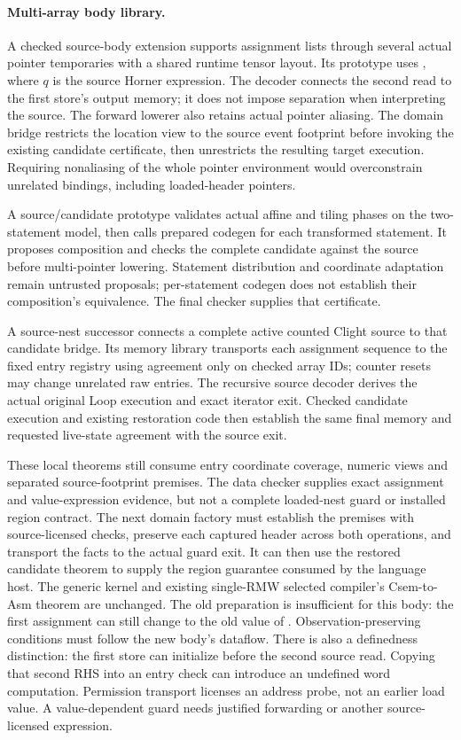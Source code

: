 \paragraph{Multi-array body library.}
A checked source-body extension supports assignment lists through several
actual pointer temporaries with a shared runtime tensor layout. Its prototype
uses , where $q$ is the source
Horner expression. The decoder connects the second read to the first store's
output memory; it does not impose separation when interpreting the source.
The forward lowerer also retains actual pointer aliasing. The domain bridge
restricts the location view to the source event footprint before invoking the
existing candidate certificate, then unrestricts the resulting target execution.
Requiring nonaliasing of the whole pointer environment would overconstrain
unrelated bindings, including loaded-header pointers.

A source/candidate prototype validates actual affine and tiling phases on
the two-statement model, then calls prepared codegen for each transformed
statement. It proposes composition and checks the complete candidate against
the source before multi-pointer lowering. Statement distribution and coordinate
adaptation remain untrusted proposals; per-statement codegen does not establish
their composition's equivalence. The final checker supplies that certificate.

A source-nest successor connects a complete active counted Clight source to
that candidate bridge. Its memory library transports each assignment sequence
to the fixed entry registry using agreement only on checked array IDs;
counter resets may change unrelated raw entries. The recursive source decoder
derives the actual original Loop execution and exact iterator exit. Checked
candidate execution and existing restoration code then establish the same
final memory and requested live-state agreement with the source exit.

These local theorems still consume entry coordinate coverage, numeric views
and separated source-footprint premises. The data checker supplies exact
assignment and value-expression evidence, but not a complete loaded-nest
guard or installed region contract. The next domain factory must establish
the premises with source-licensed checks, preserve each captured header
across both operations, and transport the facts to the actual guard exit.
It can then use the restored candidate theorem to supply the region guarantee
consumed by the language host. The generic kernel and existing single-RMW
selected compiler's Csem-to-Asm theorem are unchanged.
The old  preparation is insufficient for this body: the first
assignment can still change  to the old value of .
Observation-preserving conditions must follow the new body's dataflow.
There is also a definedness distinction: the first store can initialize
 before the second source read. Copying that second RHS into an
entry check can introduce an undefined word computation. Permission transport
licenses an address probe, not an earlier load value. A value-dependent guard
needs justified forwarding or another source-licensed expression.

